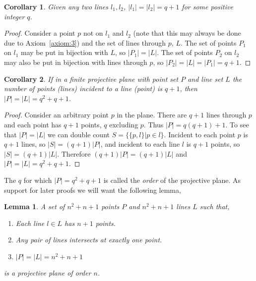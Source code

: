 \documentclass{article}
\newtheorem{lemma}{Lemma}
\newtheorem{corollary}{Corollary}
\begin{document}
    \begin{corollary}
        Given any two lines \(l_1, l_2\), \(|l_1| = |l_2| = q + 1\) for some positive integer \(q\).
    \end{corollary}
    \begin{proof}
        Consider a point \(p\) not on \(l_1\) and \(l_2\) (note that this may always be done due to Axiom~\ref{axiom:3}) and the set of lines through \(p\), \(L\). The set of points \(P_1\) on \(l_1\) may be put in bijection with \(L\), so \(|P_1| = |L|\). The set of points \(P_2\) on \(l_2\) may also be put in bijection with lines through \(p\),
        so \(|P_2| = |L| = |P_1| = q + 1\).
    \end{proof}

    \begin{corollary}
        If in a finite projective plane with point set \(P\) and line set \(L\) the number of points (lines) incident to a line (point) is \(q + 1\), then \(|P| = |L| = q^2 + q + 1\).
    \end{corollary}
    \begin{proof}\label{cor:p-count}
        Consider an arbitrary point \(p\) in the plane. There are \(q + 1\) lines through \(p\) and each point has \(q + 1\) points, \(q\) excluding \(p\). Thus \(|P| = q(q + 1) + 1\).
        To see that \(|P| = |L|\) we can double count \(S = \{\{p, l\} | p \in l\}\). Incident to each point \(p\) is \(q + 1\) lines, so \(|S| = (q + 1)|P|\), and incident to each line \(l\) is \(q + 1\) points, so \(|S| = (q + 1)|L|\). Therefore \((q + 1)|P| = (q + 1)|L|\) and \(|P| = |L| = q^2 + q + 1\).
    \end{proof}

The \(q\) for which \(|P| = q^2 + q + 1\) is called the \textit{order} of the projective plane.
    As support for later proofs we will want the following lemma,

    \begin{lemma}\label{lemma:easy-proj}
      A set of \(n^{2} + n + 1\) points \(P\) and \(n^{2} + n + 1\) lines \(L\) such that,

      \begin{enumerate}
        \item Each line \(l \in L\) has \(n + 1\) points.
        \item Any pair of lines intersects at exactly one point.
              \item \(|P| = |L| = n^{2} + n + 1\)
      \end{enumerate}

      is a projective plane of order \(n\).
    \end{lemma}
\end{document}
